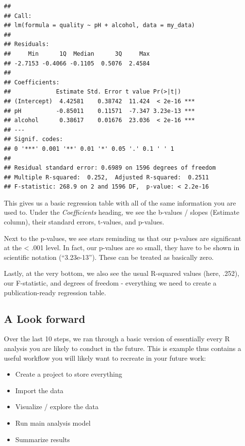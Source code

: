 \documentclass[
]{book}
\providecommand{\tightlist}{%
  \setlength{\itemsep}{0pt}\setlength{\parskip}{0pt}}
\begin{document}
\begin{verbatim}
## 
## Call:
## lm(formula = quality ~ pH + alcohol, data = my_data)
## 
## Residuals:
##     Min      1Q  Median      3Q     Max 
## -2.7153 -0.4066 -0.1105  0.5076  2.4584 
## 
## Coefficients:
##             Estimate Std. Error t value Pr(>|t|)    
## (Intercept)  4.42581    0.38742  11.424  < 2e-16 ***
## pH          -0.85011    0.11571  -7.347 3.23e-13 ***
## alcohol      0.38617    0.01676  23.036  < 2e-16 ***
## ---
## Signif. codes:  
## 0 '***' 0.001 '**' 0.01 '*' 0.05 '.' 0.1 ' ' 1
## 
## Residual standard error: 0.6989 on 1596 degrees of freedom
## Multiple R-squared:  0.252,  Adjusted R-squared:  0.2511 
## F-statistic: 268.9 on 2 and 1596 DF,  p-value: < 2.2e-16
\end{verbatim}

This gives us a basic regression table with all of the same information you are used to. Under the \emph{Coefficients} heading, we see the b-values / slopes (Estimate column), their standard errors, t-values, and p-values.

Next to the p-values, we see stars reminding us that our p-values are significant at the \textless{} .001 level. In fact, our p-values are so small, they have to be shown in scientific notation (``3.23e-13''). These can be treated as basically zero.

Lastly, at the very bottom, we also see the usual R-squared values (here, .252), our F-statistic, and degrees of freedom - everything we need to create a publication-ready regression table.

\hypertarget{a-look-forward}{%
\subsection{A Look forward}\label{a-look-forward}}

Over the last 10 steps, we ran through a basic version of essentially every R analysis you are likely to conduct in the future. This is example thus contains a useful workflow you will likely want to recreate in your future work:

\begin{itemize}
\tightlist
\item
  Create a project to store everything
\item
  Import the data
\item
  Visualize / explore the data
\item
  Run main analysis model
\item
  Summarize results
\end{itemize}
\end{document}
